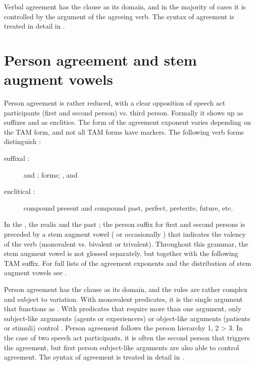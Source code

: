 Verbal  agreement has the clause as its domain, and in the majority of cases it is controlled by the  argument of the agreeing verb. The syntax of  agreement is treated in detail in .



\section{Person agreement and stem augment vowels}\label{sec:Stem augment vowels and person agreement}
\largerpage

Person agreement is rather reduced, with a clear opposition of speech act participants (first and second person) vs. third person. Formally it shows up as suffixes and as enclitics. The form of the agreement exponent varies depending on the TAM form, and not all TAM forms have  markers. The following verb forms distinguish :

\begin{description}
	\item[suffixal :]  and ;  forms; ,  and 
	\item[enclitical :] compound present and compound past, perfect, preterite, future, etc.
\end{description}
%
In the , the realis  and the past ; the person suffix for first and second persons is preceded by a stem augment vowel ( or occasionally ) that indicates the valency of the verb (monovalent vs. bivalent or trivalent). Throughout this grammar, the stem augment vowel is not glossed separately, but together with the following TAM suffix. For full lists of the agreement exponents and the distribution of stem augment vowels see .

Person agreement has the clause as its domain, and the rules are rather complex and subject to variation. With monovalent predicates, it is the single argument that functions as . With predicates that require more than one argument, only subject-like arguments (agents or experiencers) or object-like arguments (patients or stimuli) control . Person agreement follows the person hierarchy 1, 2 > 3. In the case of two speech act participants, it is often the second person that triggers the agreement, but first person subject-like arguments are also able to control agreement. The syntax of  agreement is treated in detail in .


